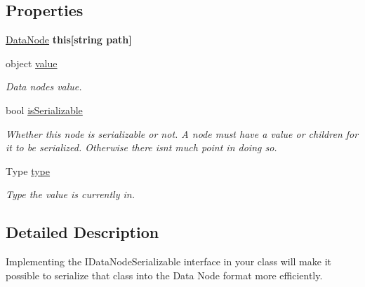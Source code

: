 \subsection*{Properties}
\begin{DoxyCompactItemize}
\item 
\mbox{\label{class_t_net_1_1_data_node_ac3c529ecc3db3604d3a7b5717d78bbc9}} 
\mbox{\hyperlink{class_t_net_1_1_data_node}{Data\+Node}} {\bfseries this\mbox{[}string path\mbox{]}}
\item 
object \mbox{\hyperlink{class_t_net_1_1_data_node_ab1b718ef512ce7e5ebff5aa1a6c8e37b}{value}}
\begin{DoxyCompactList}\small\item\em Data node\textquotesingle{}s value. \end{DoxyCompactList}\item 
bool \mbox{\hyperlink{class_t_net_1_1_data_node_a1e69f98d665e5bd58a398fc88ec37763}{is\+Serializable}}
\begin{DoxyCompactList}\small\item\em Whether this node is serializable or not. A node must have a value or children for it to be serialized. Otherwise there isn\textquotesingle{}t much point in doing so. \end{DoxyCompactList}\item 
Type \mbox{\hyperlink{class_t_net_1_1_data_node_a7a6d9db4eb81d226651ef3573655d975}{type}}
\begin{DoxyCompactList}\small\item\em Type the value is currently in. \end{DoxyCompactList}\end{DoxyCompactItemize}


\subsection{Detailed Description}
Implementing the I\+Data\+Node\+Serializable interface in your class will make it possible to serialize that class into the Data Node format more efficiently. 

